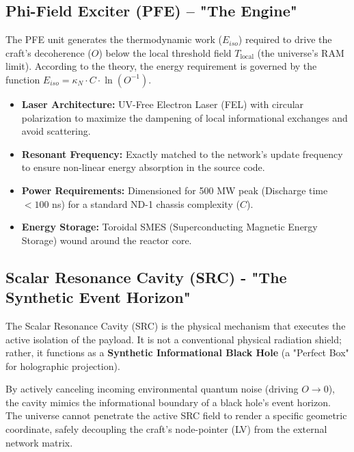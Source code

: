\documentclass[12pt,a4paper]{article}
\begin{document}
\subsection{Phi-Field Exciter (PFE) -- "The Engine"}
The PFE unit generates the thermodynamic work ($E_{iso}$) required to drive the craft's decoherence ($O$) below the local threshold field $T_{\mathrm{local}}$ (the universe's RAM limit). According to the theory, the energy requirement is governed by the function $E_{iso} = \kappa_N \cdot C \cdot \ln(O^{-1})$.

\begin{itemize}
    \item \textbf{Laser Architecture:} UV-Free Electron Laser (FEL) with circular polarization to maximize the dampening of local informational exchanges and avoid scattering.
    \item \textbf{Resonant Frequency:} Exactly matched to the network's update frequency to ensure non-linear energy absorption in the source code.
    \item \textbf{Power Requirements:} Dimensioned for 500 MW peak (Discharge time $< 100$ ns) for a standard ND-1 chassis complexity ($C$).
    \item \textbf{Energy Storage:} Toroidal SMES (Superconducting Magnetic Energy Storage) wound around the reactor core.
\end{itemize}

\subsection{Scalar Resonance Cavity (SRC) - "The Synthetic Event Horizon"}

The Scalar Resonance Cavity (SRC) is the physical mechanism that executes the active isolation of the payload. It is not a conventional physical radiation shield; rather, it functions as a \textbf{Synthetic Informational Black Hole} (a "Perfect Box" for holographic projection).

By actively canceling incoming environmental quantum noise (driving $O \rightarrow 0$), the cavity mimics the informational boundary of a black hole's event horizon. The universe cannot penetrate the active SRC field to render a specific geometric coordinate, safely decoupling the craft's node-pointer (LV) from the external network matrix.
\end{document}
